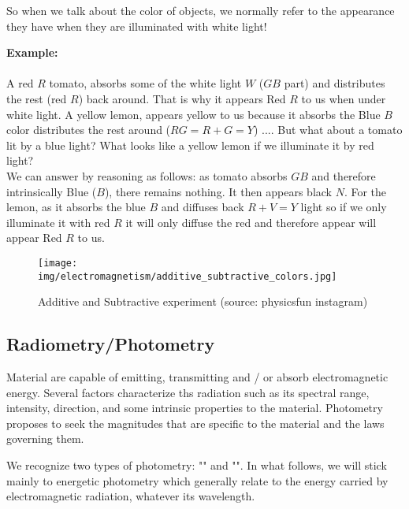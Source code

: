 	So when we talk about the color of objects, we normally refer to the appearance they have when they are illuminated with white light!
	\begin{tcolorbox}[colframe=black,colback=white,sharp corners]
	\textbf{{\Large {}}Example:}\\\\
	A red $R$ tomato, absorbs some of the white light $W$ ($GB$ part) and distributes the rest (red $R$) back around. That is why it appears Red $R$ to us when under white light. A yellow lemon, appears yellow to us because it absorbs the Blue $B$ color distributes the rest around ($RG=R+G=Y$) .... But what about a tomato lit by a blue light? What looks like a yellow lemon if we illuminate it by red light?\\
	
	We can answer by reasoning as follows: as tomato absorbs $GB$ and therefore intrinsically Blue ($B$), there remains nothing. It then appears black $N$. For the lemon, as it absorbs the blue $B$ and diffuses back $R + V=Y$ light so if we only illuminate it with red $R$ it will only diffuse the red and therefore appear will appear Red $R$ to us.
	\end{tcolorbox}
	\begin{figure}[H]
		\centering
		\texttt{[image: img/electromagnetism/additive\_subtractive\_colors.jpg]}
		\caption[Additive and Subtractive experiment]{Additive and Subtractive experiment (source: physicsfun instagram)}
	\end{figure}
	
	\pagebreak
	\subsection{Radiometry/Photometry}
	Material are capable of emitting, transmitting and / or absorb electromagnetic energy. Several factors characterize ths radiation such as its spectral range, intensity, direction, and some intrinsic properties to the material. Photometry proposes to seek the magnitudes that are specific to the material and the laws governing them.
	
	We recognize two types of photometry: "" and "". In what follows, we will stick mainly to energetic photometry which generally relate to the energy carried by electromagnetic radiation, whatever its wavelength.
	
